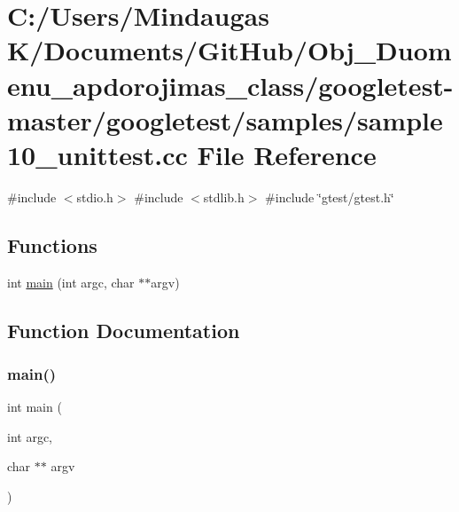 \hypertarget{googletest-master_2googletest_2samples_2sample10__unittest_8cc}{}\section{C\+:/\+Users/\+Mindaugas K/\+Documents/\+Git\+Hub/\+Obj\+\_\+\+Duomenu\+\_\+apdorojimas\+\_\+class/googletest-\/master/googletest/samples/sample10\+\_\+unittest.cc File Reference}
\label{googletest-master_2googletest_2samples_2sample10__unittest_8cc}
{\ttfamily \#include $<$stdio.\+h$>$}\newline
{\ttfamily \#include $<$stdlib.\+h$>$}\newline
{\ttfamily \#include \char`\"{}gtest/gtest.\+h\char`\"{}}\newline
\subsection*{Functions}
\begin{DoxyCompactItemize}
\item 
int \mbox{\hyperlink{googletest-master_2googletest_2samples_2sample10__unittest_8cc_a3c04138a5bfe5d72780bb7e82a18e627}{main}} (int argc, char $\ast$$\ast$argv)
\end{DoxyCompactItemize}


\subsection{Function Documentation}
\mbox{\label{googletest-master_2googletest_2samples_2sample10__unittest_8cc_a3c04138a5bfe5d72780bb7e82a18e627}} 
\subsubsection{\texorpdfstring{main()}{main()}}
{\footnotesize\ttfamily int main (\begin{DoxyParamCaption}\item[{int}]{argc,  }\item[{char $\ast$$\ast$}]{argv }\end{DoxyParamCaption})}

